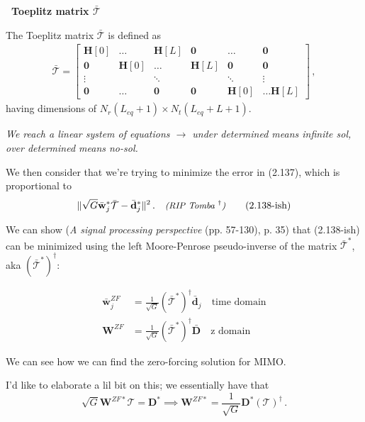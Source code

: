 \documentclass[a4paper, 12pt]{book}
\begin{document}
\begin{tcolorbox}[colback=obsidianBlue, colframe=white, boxrule=0pt, sharp corners]
    \textcolor{obsidianTextBlue}{\textbf{\faPen\ Toeplitz matrix $\bar{\mathcal{T}}$}}
    
    The Toeplitz matrix $\bar{\mathcal{T}}$ is defined as
    \begin{align}
        \bar{\mathcal{T}} = \begin{bmatrix}
        \mathbf{H}[0] & \dots & \mathbf{H}[L] & \mathbf{0} & \dots & \mathbf{0} \\
        \mathbf{0} & \mathbf{H}[0] & \dots & \mathbf{H}[L] & \mathbf{0} & \mathbf{0} \\
        \vdots & & \ddots & & \ddots & \vdots \\
        \mathbf{0} & \dots & \mathbf{0} & \mathbf{0} & \mathbf{H}[0] & \dots \mathbf{H}[L]
        \end{bmatrix} \,, \tag{2.136}
    \end{align}
    having dimensions of $N_r(L_{eq} + 1) \times N_t(L_{eq} + L + 1)$.
\end{tcolorbox}

\noindent
\textit{We reach a linear system of equations $\rightarrow$ under determined means infinite sol, over determined means no-sol.}

We then consider that we're trying to minimize the error in (2.137), which is proportional to
\begin{align}
    \lVert \sqrt{G}\bar{\mathbf{w}}_j^* \bar{\mathcal{T}} - \bar{\mathbf{d}}_j^* \rVert^2 \,. \quad \text{\small\textit{(RIP Tomba $^\dagger$)}} \tag{2.138-ish}
\end{align}

We can show (\textit{A signal processing perspective} (pp. 57-130), p. 35) that (2.138-ish) can be minimized using the left Moore-Penrose pseudo-inverse of the matrix $\bar{\mathcal{T}}^*$, aka $(\bar{\mathcal{T}}^*)^{\dagger}$:

\begin{align}
    \bar{\mathbf{w}}_j^{ZF} &= \frac{1}{\sqrt{G}} (\bar{\mathcal{T}}^*)^{\dagger} \bar{\mathbf{d}}_j \quad \text{time domain} \tag{2.145} \\
    \mathbf{W}^{ZF} &= \frac{1}{\sqrt{G}} (\bar{\mathcal{T}}^*)^{\dagger} \bar{\mathbf{D}} \quad \text{z domain} \tag{2.146}
\end{align}

We can see how we can find the zero-forcing solution for MIMO.

I'd like to elaborate a lil bit on this; we essentially have that
\[
\sqrt{G} \mathbf{W}^{ZF*} \mathcal{T} = \mathbf{D}^* \implies \mathbf{W}^{ZF*} = \frac{1}{\sqrt{G}} \mathbf{D}^* (\mathcal{T})^\dagger \,.
\]
\end{document}
